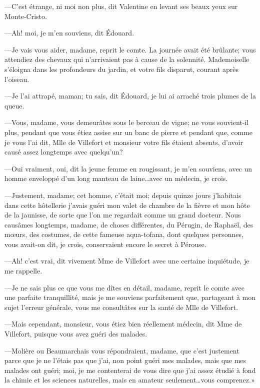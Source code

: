 —C'est étrange, ni moi non plus, dit Valentine en levant ses beaux yeux sur Monte-Cristo. 

—Ah! moi, je m'en souviens, dit Édouard. 

—Je vais vous aider, madame, reprit le comte. La journée avait été brûlante; vous attendiez des chevaux qui n'arrivaient pas à cause de la solennité. Mademoiselle s'éloigna dans les profondeurs du jardin, et votre fils disparut, courant après l'oiseau. 

—Je l'ai attrapé, maman; tu sais, dit Édouard, je lui ai arraché trois plumes de la queue. 

—Vous, madame, vous demeurâtes sous le berceau de vigne; ne vous souvient-il plus, pendant que vous étiez assise sur un banc de pierre et pendant que, comme je vous l'ai dit, Mlle de Villefort et monsieur votre fils étaient absents, d'avoir causé assez longtemps avec quelqu'un? 

—Oui vraiment, oui, dit la jeune femme en rougissant, je m'en souviens, avec un homme enveloppé d'un long manteau de laine\dots avec un médecin, je crois. 

—Justement, madame; cet homme, c'était moi; depuis quinze jours j'habitais dans cette hôtellerie j'avais guéri mon valet de chambre de la fièvre et mon hôte de la jaunisse, de sorte que l'on me regardait comme un grand docteur. Nous causâmes longtemps, madame, de choses différentes, du Pérugin, de Raphaël, des mœurs, des costumes, de cette fameuse aqua-tofana, dont quelques personnes, vous avait-on dit, je crois, conservaient encore le secret à Pérouse. 

—Ah! c'est vrai, dit vivement Mme de Villefort avec une certaine inquiétude, je me rappelle. 

—Je ne sais plus ce que vous me dîtes en détail, madame, reprit le comte avec une parfaite tranquillité, mais je me souviens parfaitement que, partageant à mon sujet l'erreur générale, vous me consultâtes sur la santé de Mlle de Villefort. 

—Mais cependant, monsieur, vous étiez bien réellement médecin, dit Mme de Villefort, puisque vous avez guéri des malades. 

—Molière ou Beaumarchais vous répondraient, madame, que c'est justement parce que je ne l'étais pas que j'ai, non point guéri mes malades, mais que mes malades ont guéri; moi, je me contenterai de vous dire que j'ai assez étudié à fond la chimie et les sciences naturelles, mais en amateur seulement\dots vous comprenez.» 

